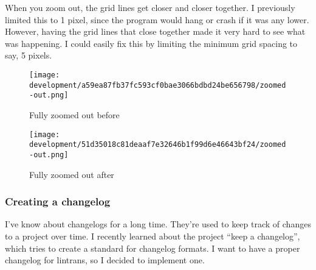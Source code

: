 \documentclass[../development.tex]{subfiles}
\begin{document}
When you zoom out, the grid lines get closer and closer together. I previously limited this to 1 pixel, since the program would hang or crash if it was any lower. However, having the grid lines that close together made it very hard to see what was happening. I could easily fix this by limiting the minimum grid spacing to say, 5 pixels.

\begin{figure}[H]
	\centering
	\begin{minipage}{0.48\linewidth}
		\centering
		\texttt{[image: development/a59ea87fb37fc593cf0bae3066bdbd24be656798/zoomed-out.png]}
		\caption{Fully zoomed out before}
		\label{fig:development:a59ea87fb37fc593cf0bae3066bdbd24be656798:zoomed-out.png}
	\end{minipage}\hfill
	\begin{minipage}{0.48\linewidth}
		\centering
		\texttt{[image: development/51d35018c81deaaf7e32646b1f99d6e46643bf24/zoomed-out.png]}
		\caption{Fully zoomed out after}
		\label{fig:development:51d35018c81deaaf7e32646b1f99d6e46643bf24:zoomed-out.png}
	\end{minipage}
\end{figure}


\subsubsection{Creating a changelog\label{development:preparing-for-v0.2.1:creating-a-changelog}}

I've know about changelogs for a long time. They're used to keep track of changes to a project over time. I recently learned about the project \enquote{keep a changelog}, which tries to create a standard for changelog formats\cite{keep-a-changelog-1.0.0}. I want to have a proper changelog for lintrans, so I decided to implement one.
\end{document}
